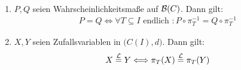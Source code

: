 \begin{satz}\label{satz7.5}\
	\begin{enumerate}[label=(\arabic*)]
		\item $P,Q$ seien Wahrscheinlichkeitsmaße auf $\mathcal{B}(C)$. Dann gilt:
		\begin{align*}
			P=Q\Longleftrightarrow\forall T\subseteq I\text{ endlich }: P\circ\pi_T^{-1}=Q\circ\pi_T^{-1}
		\end{align*}
		\item $X,Y$ seien Zufallsvariablen in $\big(C(I),d\big)$. Dann gilt:
		\begin{align*}
			X\stackrel{\mathcal{L}}{=}Y\Longleftrightarrow \pi_T(X)\stackrel{\mathcal{L}}{=}\pi_T(Y)
		\end{align*}
	\end{enumerate}
\end{satz}


